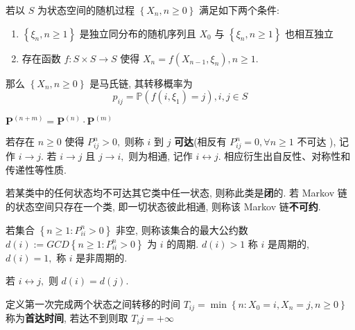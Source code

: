 \documentclass[10pt]{yerbaformat}
\begin{document}
\begin{theorem}
    若以 $S$ 为状态空间的随机过程 $\left\{X_{n}, n \geq 0\right\}$ 满足如下两个条件:
    \begin{enumerate}
        \item $\left\{\xi_{n}, n \geq 1\right\}$ 是独立同分布的随机序列且 $X_{0}$ 与 $\left\{\xi_{n}, n \geq 1\right\}$ 也相互独立
        \item 存在函数 $f: S \times S \rightarrow S$ 使得 $X_{n}=f\left(X_{n-1}, \xi_{n}\right), n \geq 1 .$
    \end{enumerate}
    那么 $\left\{X_{n}, n \geq 0\right\}$ 是马氏链, 其转移概率为
    $$p_{i j}=\mathbb{P}\left(f\left(i, \xi_{1}\right)=j\right), i, j \in S$$
\end{theorem}

\begin{theorem}
    $\mathbf{P}^{(n+m)}=\mathbf{P}^{(n)} \cdot \mathbf{P}^{(m)}$
\end{theorem}

\begin{definition}
    若存在 $n \geq 0$ 使得 $P_{i j}^{n}>0,$ 则称 $i$ 到 $j$ \textbf{可达}(相反有 $P_{i j}^{n}=0, \forall n \geq 1$ 不可达 ), 记作 $i \rightarrow j .$ 若 $i \rightarrow j$ 且 $j \rightarrow i,$ 则为相通, 记作 $i \leftrightarrow j$. 相应衍生出自反性、对称性和传递性等性质.
\end{definition}

\begin{definition}
    若某类中的任何状态均不可达其它类中任一状态, 则称此类是\textbf{闭}的. 若 Markov 链的状态空间只存在一个类, 即一切状态彼此相通, 则称该 Markov 链\textbf{不可约}.
\end{definition}

\begin{definition}[周期]
    若集合 $\left\{n \geq 1: P_{i i}^{n}>0\right\}$ 非空, 则称该集合的最大公约数 $d(i):=G C D\left\{n \geq 1: P_{i i}^{n}>0\right\}$ 为 $i$ 的周期. $d(i)>1$ 称 $i$ 是周期的, $d(i)=1,$ 称 $i$ 是非周期的.
\end{definition}

\begin{lemma}
    若 $i \leftrightarrow j,$ 则 $d(i)=d(j) .$
\end{lemma}

\begin{definition}[首达时间]
    定义第一次完成两个状态之间转移的时间 $T_{i j}=\min \left\{n: X_{0}=i, X_{n}=j, n \geq 0\right\}$ 称为\textbf{首达时间}, 若达不到则取 $T_ij=+\infty$
\end{definition}
\end{document}
